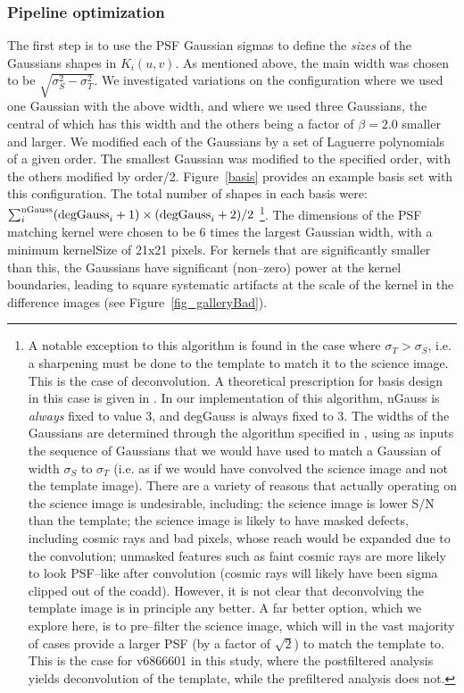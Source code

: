 \documentclass[prd, nofootinbib, floatfix, 11pt,tightenlines,times]{article}
\begin{document}
\subsubsection{Pipeline optimization}

 The first step is to use the
PSF Gaussian sigmas to define the {\it sizes} of the Gaussians shapes
in $K_i(u,v)$.  As mentioned above, the main width was chosen to be
$\sqrt{\sigma_S^2 - \sigma_T^2}$.  We investigated variations on the
configuration where we used one Gaussian with the above width, and
where we used three Gaussians, the central of which has this width and
the others being a factor of $\beta = 2.0$ smaller and larger.  We
modified each of the Gaussians by a set of Laguerre polynomials of a
given order.  The smallest Gaussian was modified to the specified
order, with the others modified by order/2.  Figure~\ref{basis}
provides an example basis set with this configuration.  The total
number of shapes in each basis were: $\sum_i^{\rm nGauss} ({\rm
  degGauss}_i+1)\times({\rm degGauss}_i+2)/2$ \footnote{ A notable
  exception to this algorithm is found in the case where $\sigma_T >
  \sigma_S$, i.e. a sharpening must be done to the template to match
  it to the science image.  This is the case of deconvolution.  A
  theoretical prescription for basis design in this case is given in
  \cite{0266-5611-26-8-085002}.  In our implementation of this algorithm, nGauss is {\it
    always} fixed to value 3, and degGauss is always fixed to 3.  The
  widths of the Gaussians are determined through the algorithm
  specified in \cite{0266-5611-26-8-085002}, using as inputs the
  sequence of Gaussians that we would have used to match a Gaussian of
  width $\sigma_S$ to $\sigma_T$ (i.e. as if we would have convolved
  the science image and not the template image).  There are a variety
  of reasons that actually operating on the science image is
  undesirable, including: the science image is lower S/N than the
  template; the science image is likely to have masked defects,
  including cosmic rays and bad pixels, whose reach would be expanded
  due to the convolution; unmasked features such as faint cosmic rays
  are more likely to look PSF--like after convolution (cosmic rays
  will likely have been sigma clipped out of the coadd).  However, it
  is not clear that deconvolving the template image is in principle
  any better.  A far better option, which we explore here, is to
  pre--filter the science image, which will in the vast majority of
  cases provide a larger PSF (by a factor of $\sqrt{2}$) to match the
  template to.  This is the case for v6866601 in this study, where the
  postfiltered analysis yields deconvolution of the template, while
  the prefiltered analysis does not.  }.
The dimensions of the PSF matching kernel were chosen to be 6 times
the largest Gaussian width, with a minimum kernelSize of 21x21 pixels.
For kernels that are significantly smaller than this, the Gaussians
have significant (non--zero) power at the kernel boundaries, leading
to square systematic artifacts at the scale of the kernel in the
difference images (see Figure~\ref{fig_galleryBad}).
\end{document}

